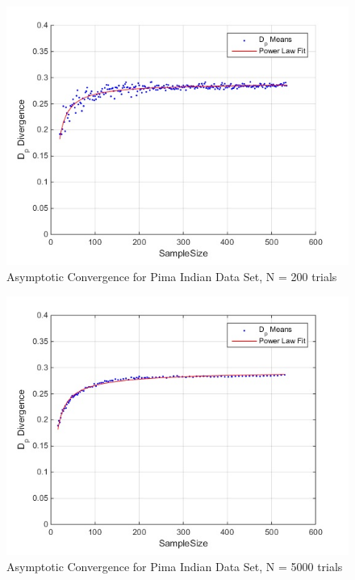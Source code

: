 \documentclass{article}
\begin{document}
		\begin{figure}[!h]
			\caption{Asymptotic Convergence for Pima Indian Data Set, N = 200 trials}
			\centering
			\includegraphics[scale=0.6]{dp_n200_pima}
		\end{figure}	
		
		\begin{figure}[!h]
			\caption{Asymptotic Convergence for Pima Indian Data Set, N = 5000 trials}
			\centering
			\includegraphics[scale=0.6]{dp_n5000}
		\end{figure}	
		
\end{document}
